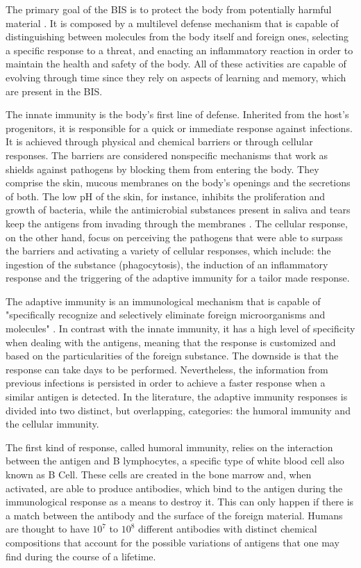 The primary goal of the BIS is to protect the body from potentially harmful material \cite{AISSOA2015}. It is composed by a multilevel defense mechanism that is capable of distinguishing between molecules from the body itself and foreign ones, selecting a specific response to a threat, and enacting an inflammatory reaction in order to maintain the health and safety of the body. All of these activities are capable of evolving through time since they rely on aspects of learning and memory, which are present in the BIS.

The innate immunity is the body's first line of defense. Inherited from the host's progenitors, it is responsible for a quick or immediate response against infections. It is achieved through physical and chemical barriers or through cellular responses. The barriers are considered nonspecific mechanisms that work as shields against pathogens by blocking them from entering the body. They comprise the skin, mucous membranes on the body's openings and the secretions of both. The low pH of the skin, for instance, inhibits the proliferation and growth of bacteria, while the antimicrobial substances present in saliva and tears keep the antigens from invading through the membranes \cite{ICBook2009}. The cellular response, on the other hand, focus on perceiving the pathogens that were able to surpass the barriers and activating a variety of cellular responses, which include: the ingestion of the substance (phagocytosis), the induction of an inflammatory response and the triggering of the adaptive immunity for a tailor made response. 

The adaptive immunity is an immunological mechanism that is capable of "specifically recognize and selectively eliminate foreign microorganisms and molecules" \cite{ICBook2009}. In contrast with the innate immunity, it has a high level of specificity when dealing with the antigens, meaning that the response is customized and based on the particularities of the foreign substance. The downside is that the response can take days to be performed. Nevertheless, the information from previous infections is persisted in order to achieve a faster response when a similar antigen is detected. In the literature, the adaptive immunity responses is divided into two distinct, but overlapping, categories: the humoral immunity and the cellular immunity.

The first kind of response, called humoral immunity, relies on the interaction between the antigen and B lymphocytes, a specific type of white blood cell also known as B Cell. These cells are created in the bone marrow and, when activated, are able to produce antibodies, which bind to the antigen during the immunological response as a means to destroy it. This can only happen if there is a match between the antibody and the surface of the foreign material. Humans are thought to have \(10^7\) to \(10^8\) different antibodies with distinct chemical compositions \cite{ImmuneSysAdapML1986} that account for the possible variations of antigens that one may find during the course of a lifetime.

